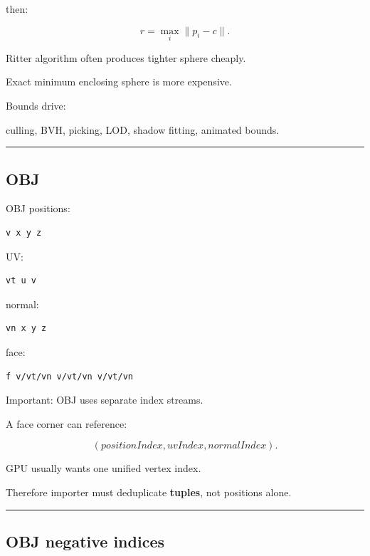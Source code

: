 then:

\[
r=
\max_i\|p_i-c\|.
\]

Ritter algorithm often produces tighter sphere cheaply.

Exact minimum enclosing sphere is more expensive.

Bounds drive:

culling, BVH, picking, LOD, shadow fitting, animated bounds.

\begin{center}\rule{0.5\linewidth}{0.5pt}\end{center}

\subsection{OBJ}\label{04-visual-computing-ii-ch041-obj}

\hypertarget{04-visual-computing-ii-ch041-obj}{}

OBJ positions:

\begin{verbatim}
v x y z
\end{verbatim}

UV:

\begin{verbatim}
vt u v
\end{verbatim}

normal:

\begin{verbatim}
vn x y z
\end{verbatim}

face:

\begin{verbatim}
f v/vt/vn v/vt/vn v/vt/vn
\end{verbatim}

Important: OBJ uses separate index streams.

A face corner can reference:

\[
(positionIndex,
uvIndex,
normalIndex).
\]

GPU usually wants one unified vertex index.

Therefore importer must deduplicate \textbf{tuples}, not positions alone.

\begin{center}\rule{0.5\linewidth}{0.5pt}\end{center}

\subsection{OBJ negative indices}\label{04-visual-computing-ii-ch041-obj-negative-indices}

